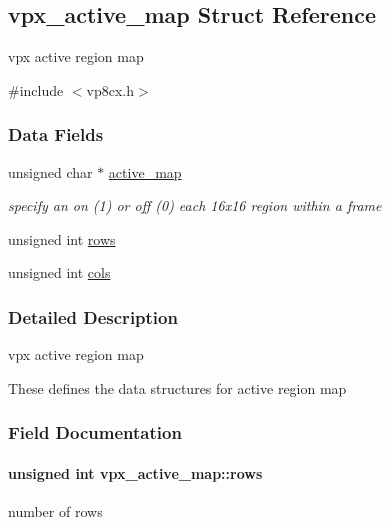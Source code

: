 \hypertarget{structvpx__active__map}{}\subsection{vpx\+\_\+active\+\_\+map Struct Reference}
\label{structvpx__active__map}


vpx active region map  




{\ttfamily \#include $<$vp8cx.\+h$>$}

\subsubsection*{Data Fields}
\begin{DoxyCompactItemize}
\item 
unsigned char $\ast$ \hyperlink{structvpx__active__map_a6e5e092e766ae3f65d280c68c9f6df82}{active\+\_\+map}\hypertarget{structvpx__active__map_a6e5e092e766ae3f65d280c68c9f6df82}{}\label{structvpx__active__map_a6e5e092e766ae3f65d280c68c9f6df82}

\begin{DoxyCompactList}\small\item\em specify an on (1) or off (0) each 16x16 region within a frame \end{DoxyCompactList}\item 
unsigned int \hyperlink{structvpx__active__map_a29424c92ff201f97db9bf62d16dfab4d}{rows}
\item 
unsigned int \hyperlink{structvpx__active__map_a310edb5efc62d596b2c276e3f7d1b42a}{cols}
\end{DoxyCompactItemize}


\subsubsection{Detailed Description}
vpx active region map 

These defines the data structures for active region map 

\subsubsection{Field Documentation}
\paragraph[{\texorpdfstring{rows}{rows}}]{\setlength{\rightskip}{0pt plus 5cm}unsigned int vpx\+\_\+active\+\_\+map\+::rows}\hypertarget{structvpx__active__map_a29424c92ff201f97db9bf62d16dfab4d}{}\label{structvpx__active__map_a29424c92ff201f97db9bf62d16dfab4d}
number of rows 
